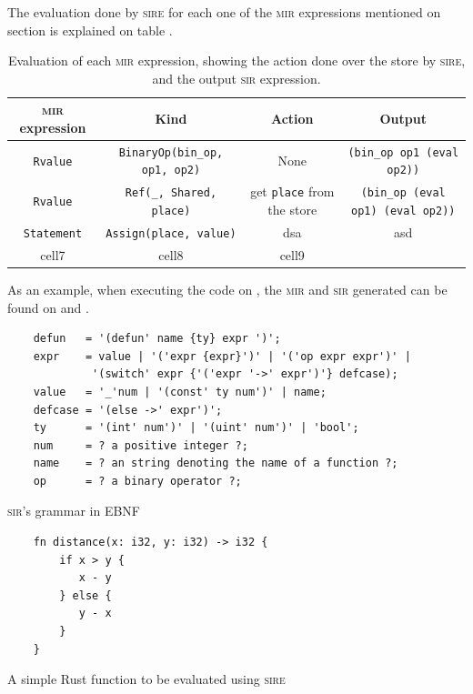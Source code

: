 The evaluation done by \textsc{sire} for each one of the \textsc{mir}
expressions mentioned on section  is explained
on table .

\begin{table}[ht]
    \centering
    \begin{tabular}{ | c | c | c | c | }
        \hline
        \textsc{mir} expression & Kind & Action & Output \\ 
        \hline 
        \texttt{Rvalue} & \texttt{BinaryOp(bin\_op, op1, op2)} & None & \texttt{(bin\_op op1 (eval op2))} \\
        \texttt{Rvalue} & \texttt{Ref(\_, Shared, place)} & get \texttt{place} from the store & \texttt{(bin\_op (eval op1) (eval op2))} \\
        \texttt{Statement} & \texttt{Assign(place, value)} & dsa & asd \\  
        cell7 & cell8 & cell9 \\
        \hline
    \end{tabular}
    \caption{Evaluation of each \textsc{mir} expression, showing the action
    done over the store by \textsc{sire}, and the output \textsc{sir}
    expression. }
  \label{tab:sire_table}
\end{table}


As an example, when executing the code on , the
\textsc{mir} and \textsc{sir} generated can be found on
 and .

\begin{listing}[ht]
    \begin{verbatim}
    defun   = '(defun' name {ty} expr ')';
    expr    = value | '('expr {expr}')' | '('op expr expr')' | 
             '(switch' expr {'('expr '->' expr')'} defcase);
    value   = '_'num | '(const' ty num')' | name;
    defcase = '(else ->' expr')';
    ty      = '(int' num')' | '(uint' num')' | 'bool';
    num     = ? a positive integer ?;
    name    = ? an string denoting the name of a function ?;
    op      = ? a binary operator ?;
    \end{verbatim}
    \caption{\textsc{sir}'s grammar in EBNF}
  \label{lst:sir_grammar}
\end{listing}

\begin{listing}[ht]
    \begin{verbatim}
    fn distance(x: i32, y: i32) -> i32 {
        if x > y {
           x - y
        } else {
           y - x
        }
    }
    \end{verbatim}
    \caption{A simple Rust function to be evaluated using \textsc{sire}}
  \label{lst:rust_sire_example}
\end{listing}

